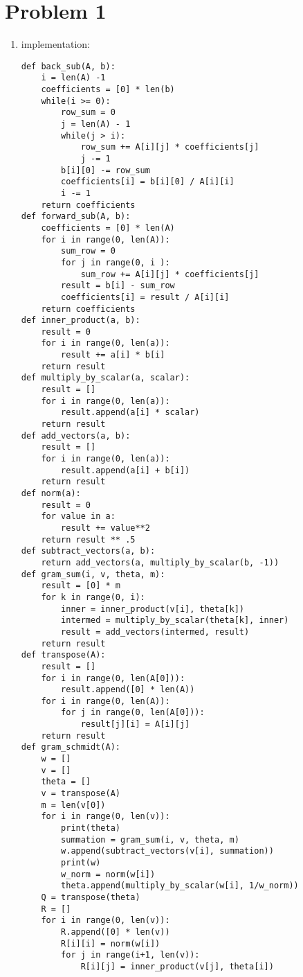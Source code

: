 \documentclass{article}
\title{\thetitle}
\author{\theauthor}
\begin{document}
\maketitle
\section* {Problem 1}
\begin{enumerate}
\item implementation: \\
\begin{lstlisting}
def back_sub(A, b):
    i = len(A) -1 
    coefficients = [0] * len(b)
    while(i >= 0):
        row_sum = 0
        j = len(A) - 1
        while(j > i):
            row_sum += A[i][j] * coefficients[j]
            j -= 1
        b[i][0] -= row_sum
        coefficients[i] = b[i][0] / A[i][i]
        i -= 1
    return coefficients
def forward_sub(A, b):
    coefficients = [0] * len(A)
    for i in range(0, len(A)):
        sum_row = 0
        for j in range(0, i ):
            sum_row += A[i][j] * coefficients[j]
        result = b[i] - sum_row
        coefficients[i] = result / A[i][i]
    return coefficients
def inner_product(a, b):
    result = 0
    for i in range(0, len(a)):
        result += a[i] * b[i]
    return result
def multiply_by_scalar(a, scalar):
    result = []
    for i in range(0, len(a)):
        result.append(a[i] * scalar)
    return result
def add_vectors(a, b):
    result = []
    for i in range(0, len(a)):
        result.append(a[i] + b[i])
    return result
def norm(a):
    result = 0
    for value in a:
        result += value**2
    return result ** .5
def subtract_vectors(a, b):
    return add_vectors(a, multiply_by_scalar(b, -1))
def gram_sum(i, v, theta, m):
    result = [0] * m
    for k in range(0, i):
        inner = inner_product(v[i], theta[k])
        intermed = multiply_by_scalar(theta[k], inner)
        result = add_vectors(intermed, result)
    return result
def transpose(A):
    result = []
    for i in range(0, len(A[0])):
        result.append([0] * len(A))
    for i in range(0, len(A)):
        for j in range(0, len(A[0])):
            result[j][i] = A[i][j]
    return result
def gram_schmidt(A):
    w = []
    v = []
    theta = []
    v = transpose(A)    
    m = len(v[0])
    for i in range(0, len(v)):
        print(theta)
        summation = gram_sum(i, v, theta, m)
        w.append(subtract_vectors(v[i], summation))
        print(w)
        w_norm = norm(w[i])
        theta.append(multiply_by_scalar(w[i], 1/w_norm))
    Q = transpose(theta)
    R = []
    for i in range(0, len(v)):
        R.append([0] * len(v))
        R[i][i] = norm(w[i])
        for j in range(i+1, len(v)):
            R[i][j] = inner_product(v[j], theta[i])
    

\end{lstlisting}
\end{enumerate}
\end{document}
